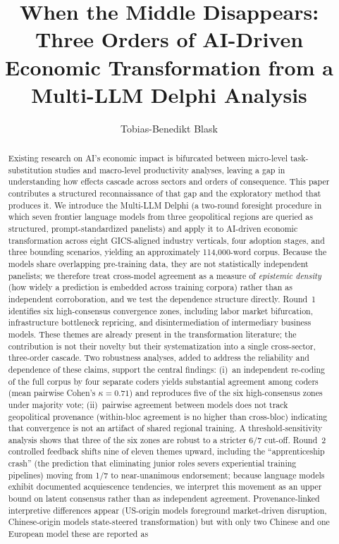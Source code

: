 \documentclass[preprint,review,12pt]{elsarticle}
\begin{document}
\begin{frontmatter}

\title{When the Middle Disappears: Three Orders of AI-Driven Economic Transformation from a Multi-LLM Delphi Analysis}

\author[hsharz]{Tobias-Benedikt Blask}

\address[hsharz]{Harz University of Applied Sciences, Wernigerode, Germany}

\begin{abstract}
Existing research on AI's economic impact is bifurcated between micro-level task-substitution studies and macro-level productivity analyses, leaving a gap in understanding how effects cascade across sectors and orders of consequence. This paper contributes a structured reconnaissance of that gap and the exploratory method that produces it. We introduce the Multi-LLM Delphi (a two-round foresight procedure in which seven frontier language models from three geopolitical regions are queried as structured, prompt-standardized panelists) and apply it to AI-driven economic transformation across eight GICS-aligned industry verticals, four adoption stages, and three bounding scenarios, yielding an approximately 114,000-word corpus. Because the models share overlapping pre-training data, they are not statistically independent panelists; we therefore treat cross-model agreement as a measure of \emph{epistemic density} (how widely a prediction is embedded across training corpora) rather than as independent corroboration, and we test the dependence structure directly. Round~1 identifies six high-consensus convergence zones, including labor market bifurcation, infrastructure bottleneck repricing, and disintermediation of intermediary business models. These themes are already present in the transformation literature; the contribution is not their novelty but their systematization into a single cross-sector, three-order cascade. Two robustness analyses, added to address the reliability and dependence of these claims, support the central findings: (i)~an independent re-coding of the full corpus by four separate coders yields substantial agreement among coders (mean pairwise Cohen's $\kappa=0.71$) and reproduces five of the six high-consensus zones under majority vote; (ii)~pairwise agreement between models does not track geopolitical provenance (within-bloc agreement is no higher than cross-bloc) indicating that convergence is not an artifact of shared regional training. A threshold-sensitivity analysis shows that three of the six zones are robust to a stricter 6/7 cut-off. Round~2 controlled feedback shifts nine of eleven themes upward, including the ``apprenticeship crash'' (the prediction that eliminating junior roles severs experiential training pipelines) moving from 1/7 to near-unanimous endorsement; because language models exhibit documented acquiescence tendencies, we interpret this movement as an upper bound on latent consensus rather than as independent agreement. Provenance-linked interpretive differences appear (US-origin models foreground market-driven disruption, Chinese-origin models state-steered transformation) but with only two Chinese and one European model these are reported as 
\end{abstract}
\end{frontmatter}
\end{document}
